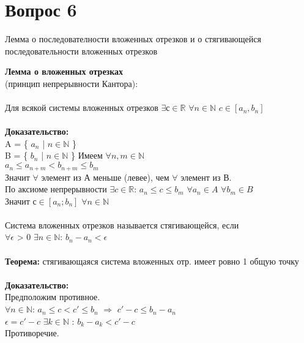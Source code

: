 \documentclass{article}
\DeclareMathOperator{\Exists}{\exists}
\DeclareMathOperator{\Forall}{\forall}
\begin{document}
\section*{Вопрос 6}
 
\begin{center}
   {Лемма о последователности вложенных отрезков и о стягивающейся последовательности вложенных отрезков} \\
\end{center}
 
   \textbf{Лемма о вложенных отрезках} \\
   (принцип непрерывности Кантора):\\
   \\
   Для всякой системы вложенных отрезков $\Exists с \in \mathbb{R}$  $\Forall n \in \mathbb{N} $ $c \in [a_n, b_n]$ \\
   \\
   \textbf{Доказательство: } \\
   A = \{ $a_n$ | $n \in \mathbb{N}$ \} \\
   B = \{ $b_n$ | $n \in \mathbb{N}$ \}
   Имеем $\Forall n, m \in \mathbb{N}$ \\
   $a_n \leq a_{n + m} < b_{n + m} \leq b_m$ \\
   Значит $\Forall$ элемент из А меньше (левее), чем $\Forall$ элемент из В. \\
   По аксиоме непрерывности $\Exists c \in \mathbb{R}$: $a_n \leq c \leq b_m$ $\Forall a_n \in A$ $\Forall b_m \in B$ \\
   Значит $ с  \in [a_n;b_n]$ $\Forall n \in \mathbb{N}$ \\
   \\
   Система вложенных отрезков называется стягивающейся, если \\
   $\Forall \epsilon $ > 0 $ \Exists n \in \mathbb{N}$: $b_n - a_n < \epsilon$\\
   \\
   \textbf{Теорема: }
   стягивающаяся система вложенных отр. имеет ровно 1 общую точку \\
   \\
   \textbf{Доказательство:} \\
   Предположим противное. \\
   $\Forall n \in \mathbb{N}$: $a_n \leq c < c' \leq b_n$ $\Rightarrow$ $ c' - c \leq b_n - a_n$ \\
   $\epsilon = c' - c$ $\Exists k \in \mathbb{N}$ : $b_k - a_k < c' -c$\\
    Противоречие.
 
\end{document}
